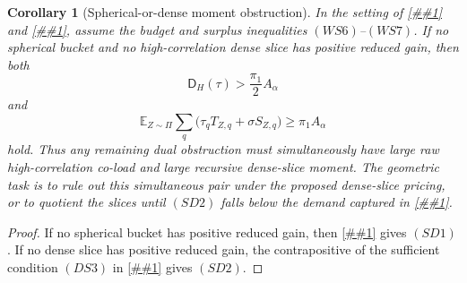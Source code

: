 \documentclass[10pt]{article}
\newcommand{\cref}[1]{\ref{##1}}
\newtheorem{corollary}[theorem]{Corollary}
\theoremstyle{definition}
\newcommand{\E}{\mathbb{E}}
\begin{document}
\begin{corollary}[Spherical-or-dense moment obstruction]
   \label{cor:spherical-dense-moment-obstruction}
   In the setting of \cref{lem:weighted-spherical-reduced-gain} and
   \cref{lem:high-correlation-dense-slice-separator},
   assume the budget and surplus inequalities \((WS6)\)--\((WS7)\).  If no
   spherical bucket and no high-correlation dense slice has positive reduced
   gain, then both
   \[
      \mathsf D_H(\tau)>\frac{\pi_1}{2}A_\alpha
      \tag{SD1}
   \]
   and
   \[
      \E_{Z\sim\Pi}\sum_q
      \bigl(\tau_qT_{Z,q}+\sigma S_{Z,q}\bigr)
      \ge
      \pi_1A_\alpha
      \tag{SD2}
   \]
   hold.  Thus any remaining dual obstruction must simultaneously have large raw
   high-correlation co-load and large recursive dense-slice moment.  The
   geometric task is to rule out this simultaneous pair under the proposed
   dense-slice pricing, or to quotient the slices until \((SD2)\) falls below the
   demand captured in \cref{lem:high-correlation-dense-slice-separator}.
\end{corollary}

\begin{proof}
   If no spherical bucket has positive reduced gain, then
   \cref{lem:weighted-spherical-reduced-gain} gives \((SD1)\).  If no dense slice
   has positive reduced gain, the contrapositive of the sufficient condition
   \((DS3)\) in \cref{lem:high-correlation-dense-slice-separator} gives
   \((SD2)\).
\end{proof}
\end{document}
